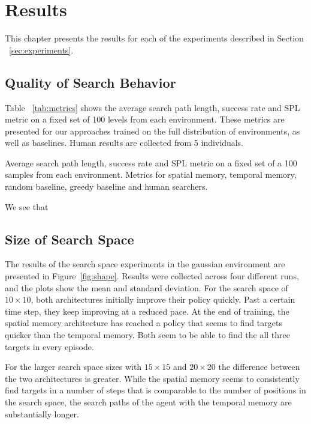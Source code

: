 \chapter{Results}
\label{cha:results}

This chapter presents the results for each of the experiments described in Section ~\ref{sec:experiments}.

\section{Quality of Search Behavior}

Table ~\ref{tab:metrics} shows the average search path length, success rate and SPL metric on a fixed set of 100 levels from each environment.
These metrics are presented for our approaches trained on the full distribution of environments, as well as baselines.
Human results are collected from 5 individuals.

\begin{table}
    \centering
    \label{tab:metrics}
    \caption[Quality results.]{Average search path length, success rate and SPL metric on a fixed set of a 100 samples from each environment. Metrics for spatial memory, temporal memory, random baseline, greedy baseline and human searchers.}
    
\end{table}

We see that

\section{Size of Search Space}

The results of the search space experiments in the gaussian environment are presented in Figure~\ref{fig:shape}.
Results were collected across four different runs, and the plots show the mean and standard deviation.
For the search space of \(10 \times 10\), both architectures initially improve their policy quickly.
Past a certain time step, they keep improving at a reduced pace.
At the end of training, the spatial memory architecture has reached a policy that seems to find targets quicker than the temporal memory.
Both seem to be able to find the all three targets in every episode.

For the larger search space sizes with \(15 \times 15\) and \(20 \times 20\) the difference between the two architectures is greater.
While the spatial memory seems to consistently find targets in a number of steps that is comparable to the number of positions in the search space,
the search paths of the agent with the temporal memory are substantially longer.


